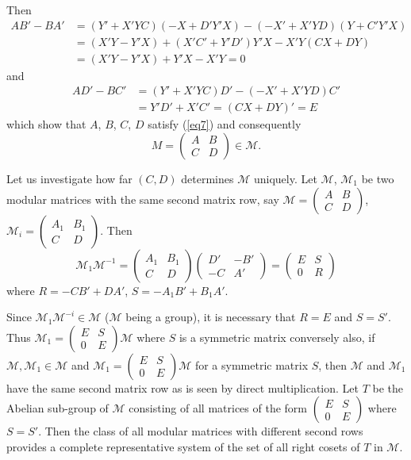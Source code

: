 Then
\begin{align*}
AB' - BA' & = (Y'+ X' YC)(-X + D'Y'X) - (-X' + X' Y D)(Y + C' Y' X)\\
& = (X'Y - Y'X) + (X'C' + Y'D')Y'X -X'Y(C X + DY)\\
& = (X'Y - Y'X) + Y'X -X'Y = 0
\end{align*}
and\pageoriginale  
\begin{align*}
AD' - BC' & = (Y' + X'YC) D' -(-X' + X' Y D)C'\\
&  = Y'D' + X'C' = (CX +
DY)' = E 
\end{align*}
which show that $A$, $B$, $C$, $D$ satisfy (\ref{eq7}) and consequently
$$
M = \begin{pmatrix} 
A & B \\
C & D  
\end{pmatrix} \in \mathcal{M}.
$$

Let us investigate how far $(C, D)$ determines $\mathcal{M}$
uniquely. Let $\mathcal{M}$, 
$\mathcal{M}_1$ be two modular matrices with the same second matrix
row, say $\mathcal{M}  
= \begin{pmatrix} A & B \\ C & D  \end{pmatrix}$,   $\mathcal{M}_i   
= \begin{pmatrix} A_1 & B_1 \\ C & D \end{pmatrix}$. Then 
$$ 
\mathcal{M}_1\mathcal{M}^{-1} = \begin{pmatrix} A_1 & B_1 \\ C & 
  D \end{pmatrix} \begin{pmatrix} D' & -B' \\ -C  & A' \end{pmatrix}
= \begin{pmatrix} E & S \\ 0 & R \end{pmatrix} 
$$
where $R = - CB' + DA'$, $S = - A_1B' + B_1A'$. 

Since $\mathcal{M}_1 \mathcal{M}^{-i} \in \mathcal{M}$ ($\mathcal{M}$
being a group), it is necessary that $R 
= E$ and $S = S'$. Thus $\mathcal{M}_1 = \begin{pmatrix} E & S \\ 0 &
  E  \end{pmatrix}\mathcal{M}$ where $S$ is a symmetric matrix
conversely also, 
if $\mathcal{M}, \mathcal{M}_1 \in \mathcal{M}$ and $\mathcal{M}_1
= \begin{pmatrix} E & S \\ 0 & 
  E  \end{pmatrix}\mathcal{M}$ for a symmetric matrix $S$, then
$\mathcal{M}$ and $\mathcal{M}_1$ 
have the same second matrix row as is seen by direct
multiplication. Let $T$ be the Abelian sub-group of $\mathcal{M}$ consisting of
all matrices of the form $\begin{pmatrix} E & S \\ 0 &
  E \end{pmatrix}$ where $S = S'$. Then the class of all modular
matrices with different second rows provides a complete representative
system of the set of all right cosets of $T$ in $\mathcal{M}$. 

